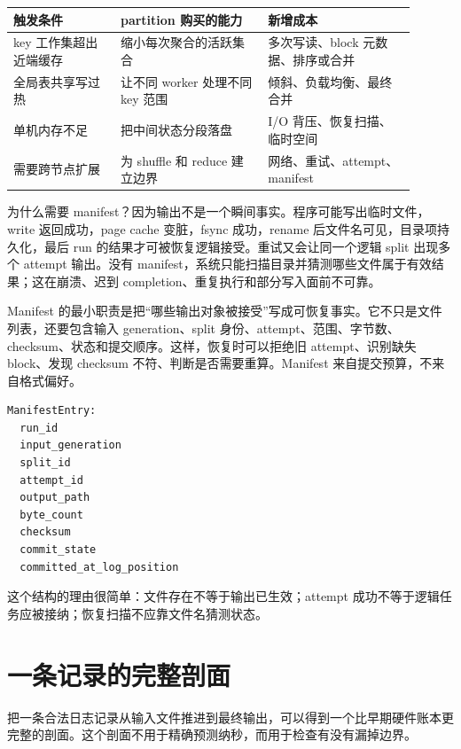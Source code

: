\begin{center}
\small
\begin{tabular}{@{}p{0.24\linewidth}p{0.33\linewidth}p{0.33\linewidth}@{}}
\toprule
触发条件 & partition 购买的能力 & 新增成本 \\
\midrule
key 工作集超出近端缓存 & 缩小每次聚合的活跃集合 & 多次写读、block 元数据、排序或合并 \\
全局表共享写过热 & 让不同 worker 处理不同 key 范围 & 倾斜、负载均衡、最终合并 \\
单机内存不足 & 把中间状态分段落盘 & I/O 背压、恢复扫描、临时空间 \\
需要跨节点扩展 & 为 shuffle 和 reduce 建立边界 & 网络、重试、attempt、manifest \\
\bottomrule
\end{tabular}
\end{center}

为什么需要 manifest？因为输出不是一个瞬间事实。程序可能写出临时文件，write 返回成功，page cache 变脏，fsync 成功，rename 后文件名可见，目录项持久化，最后 run 的结果才可被恢复逻辑接受。重试又会让同一个逻辑 split 出现多个 attempt 输出。没有 manifest，系统只能扫描目录并猜测哪些文件属于有效结果；这在崩溃、迟到 completion、重复执行和部分写入面前不可靠。

Manifest 的最小职责是把“哪些输出对象被接受”写成可恢复事实。它不只是文件列表，还要包含输入 generation、split 身份、attempt、范围、字节数、checksum、状态和提交顺序。这样，恢复时可以拒绝旧 attempt、识别缺失 block、发现 checksum 不符、判断是否需要重算。Manifest 来自提交预算，不来自格式偏好。

\begin{lstlisting}[numbers=none,caption={manifest entry 的最小责任}]
ManifestEntry:
  run_id
  input_generation
  split_id
  attempt_id
  output_path
  byte_count
  checksum
  commit_state
  committed_at_log_position
\end{lstlisting}

这个结构的理由很简单：文件存在不等于输出已生效；attempt 成功不等于逻辑任务应被接纳；恢复扫描不应靠文件名猜测状态。

\section{一条记录的完整剖面}

把一条合法日志记录从输入文件推进到最终输出，可以得到一个比早期硬件账本更完整的剖面。这个剖面不用于精确预测纳秒，而用于检查有没有漏掉边界。

